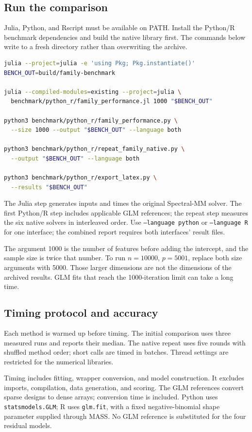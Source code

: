 \documentclass[11pt,a4paper]{article}
\newcommand{\code}[1]{\texttt{#1}}
\begin{document}
\subsection{Run the comparison}
Julia, Python, and Rscript must be available on PATH. Install the Python/R
benchmark dependencies and build the native library first.
The commands below write to a fresh directory rather than overwriting the archive.
\begin{lstlisting}[language=bash]
julia --project=julia -e 'using Pkg; Pkg.instantiate()'
BENCH_OUT=build/family-benchmark

julia --compiled-modules=existing --project=julia \
  benchmark/python_r/family_performance.jl 1000 "$BENCH_OUT"

python3 benchmark/python_r/family_performance.py \
  --size 1000 --output "$BENCH_OUT" --language both

python3 benchmark/python_r/repeat_family_native.py \
  --output "$BENCH_OUT" --language both

python3 benchmark/python_r/export_latex.py \
  --results "$BENCH_OUT"
\end{lstlisting}
The Julia step generates inputs and times the original Spectral-MM solver.
The first Python/R step includes applicable GLM references; the repeat step
measures the six native solvers in interleaved order.
Use \code{--language python} or \code{--language R} for one interface; the combined
report requires both interfaces' result files.

The argument 1000 is the number of features before adding the intercept, and the
sample size is twice that number. To run $n=10000$, $p=5001$, replace both size
arguments with 5000. Those larger dimensions are not the dimensions of the
archived results. GLM fits that reach the 1000-iteration limit can take a long time.

\subsection{Timing protocol and accuracy}
Each method is warmed up before timing. The initial comparison uses three
measured runs and reports their median. The native repeat uses five rounds with
shuffled method order; short calls are timed in batches. Thread settings are
restricted for the numerical libraries.

Timing includes fitting, wrapper conversion, and model construction. It excludes
imports, compilation, data generation, and scoring. The GLM references convert
sparse designs to dense arrays; conversion time is included.
Python uses \code{statsmodels.GLM}; R uses \code{glm.fit}, with a fixed
negative-binomial shape parameter supplied through MASS. No GLM reference is
substituted for the four residual models.
\end{document}
